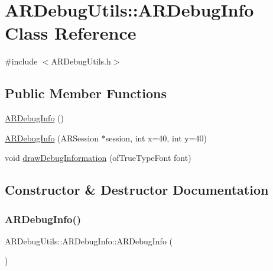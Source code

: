 \hypertarget{class_a_r_debug_utils_1_1_a_r_debug_info}{}\section{A\+R\+Debug\+Utils\+:\+:A\+R\+Debug\+Info Class Reference}
\label{class_a_r_debug_utils_1_1_a_r_debug_info}


{\ttfamily \#include $<$A\+R\+Debug\+Utils.\+h$>$}

\subsection*{Public Member Functions}
\begin{DoxyCompactItemize}
\item 
\mbox{\hyperlink{class_a_r_debug_utils_1_1_a_r_debug_info_aeb168fa1784b8977ac39358347e22d68}{A\+R\+Debug\+Info}} ()
\item 
\mbox{\hyperlink{class_a_r_debug_utils_1_1_a_r_debug_info_ad09bdc5defd7837ed74261bc3bf3a096}{A\+R\+Debug\+Info}} (A\+R\+Session $\ast$session, int x=40, int y=40)
\item 
void \mbox{\hyperlink{class_a_r_debug_utils_1_1_a_r_debug_info_a480025850cdabb91cfc13a2cf8351114}{draw\+Debug\+Information}} (of\+True\+Type\+Font font)
\end{DoxyCompactItemize}


\subsection{Constructor \& Destructor Documentation}
\mbox{\label{class_a_r_debug_utils_1_1_a_r_debug_info_aeb168fa1784b8977ac39358347e22d68}} 
\subsubsection{\texorpdfstring{A\+R\+Debug\+Info()}{ARDebugInfo()}\hspace{0.1cm}{\footnotesize\ttfamily [1/2]}}
{\footnotesize\ttfamily A\+R\+Debug\+Utils\+::\+A\+R\+Debug\+Info\+::\+A\+R\+Debug\+Info (\begin{DoxyParamCaption}{ }\end{DoxyParamCaption})\hspace{0.3cm}{\ttfamily [inline]}}

